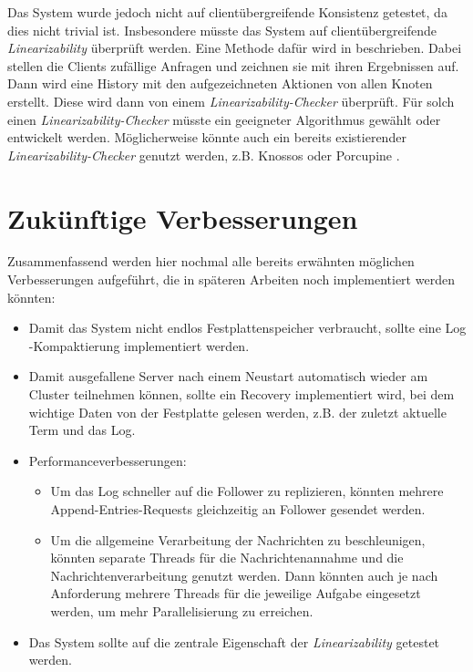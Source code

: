  Das System wurde jedoch nicht auf clientübergreifende Konsistenz getestet, da dies nicht trivial ist. Insbesondere müsste das System auf clientübergreifende \textit{Linearizability} überprüft werden. Eine Methode dafür wird in \cite{testing} beschrieben. Dabei stellen die Clients zufällige Anfragen und zeichnen sie mit ihren Ergebnissen auf. Dann wird eine History mit den aufgezeichneten Aktionen von allen Knoten erstellt. Diese wird dann von einem \textit{Linearizability-Checker} überprüft. Für solch einen \textit{Linearizability-Checker} müsste ein geeigneter Algorithmus gewählt oder entwickelt werden. Möglicherweise könnte auch ein bereits existierender \textit{Linearizability-Checker} genutzt werden, z.B. Knossos \cite{knossos} oder Porcupine \cite{porcupine}.\\


\section{Zukünftige Verbesserungen}

Zusammenfassend werden hier nochmal alle bereits erwähnten möglichen Verbesserungen aufgeführt, die in späteren Arbeiten noch implementiert werden könnten:

\begin{itemize}
	\item Damit das System nicht endlos Festplattenspeicher verbraucht, sollte eine Log\\-Kompaktierung implementiert werden.
	\item Damit ausgefallene Server nach einem Neustart automatisch wieder am Cluster teilnehmen können, sollte ein Recovery implementiert wird, bei dem wichtige Daten von der Festplatte gelesen werden, z.B. der zuletzt aktuelle Term und das Log.
	\item Performanceverbesserungen: 
		\begin{itemize}
			\item Um das Log schneller auf die Follower zu replizieren, könnten mehrere Append-Entries-Requests gleichzeitig an Follower gesendet werden. 
			\item Um die allgemeine Verarbeitung der Nachrichten zu beschleunigen, könnten separate Threads für die Nachrichtenannahme und die Nachrichtenverarbeitung genutzt werden. Dann könnten auch je nach Anforderung mehrere Threads für die jeweilige Aufgabe eingesetzt werden, um mehr Parallelisierung zu erreichen.
		\end{itemize}
	\item Das System sollte auf die zentrale Eigenschaft der \textit{Linearizability} getestet werden.
\end{itemize}